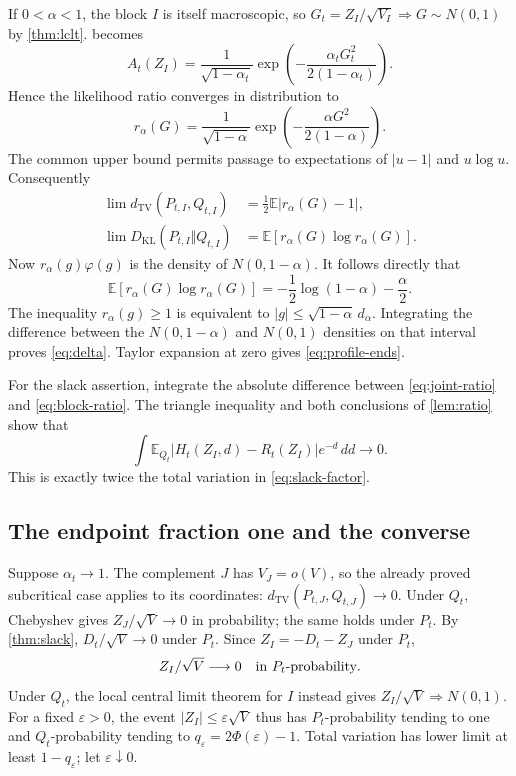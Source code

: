 \documentclass[11pt,a4paper]{article}
\numberwithin{equation}{section}
\theoremstyle{definition}
\theoremstyle{remark}
\newcommand{\E}{\mathbb E}
\newcommand{\Qt}{Q_t}
\newcommand{\TV}{d_{\mathrm{TV}}}
\newcommand{\KL}{D_{\mathrm{KL}}}
\newcommand{\phiN}{\varphi}
\newcommand{\PhiN}{\Phi}
\begin{document}
If $0<\alpha<1$, the block $I$ is itself macroscopic, so
$G_t=Z_I/\sqrt{V_I}\Rightarrow G\sim N(0,1)$ by
\cref{thm:lclt}.  becomes
\[
 A_t(Z_I)=\frac1{\sqrt{1-\alpha_t}}
       \exp\left(-\frac{\alpha_tG_t^2}{2(1-\alpha_t)}\right).
\]
Hence the likelihood ratio converges in distribution to
\begin{equation}\label{eq:r-alpha}
 r_\alpha(G)=\frac1{\sqrt{1-\alpha}}
       \exp\left(-\frac{\alpha G^2}{2(1-\alpha)}\right).
\end{equation}
The common upper bound permits passage to expectations of
$|u-1|$ and $u\log u$. Consequently
\begin{align*}
 \lim\TV(P_{t,I},Q_{t,I})&=\frac12\E|r_\alpha(G)-1|,\\
 \lim\KL(P_{t,I}\Vert Q_{t,I})&=\E[r_\alpha(G)\log r_\alpha(G)].
\end{align*}
Now $r_\alpha(g)\phiN(g)$ is the density of
$N(0,1-\alpha)$. It follows directly that
\[
 \E[r_\alpha(G)\log r_\alpha(G)]
 =-\frac12\log(1-\alpha)-\frac\alpha2.
\]
The inequality $r_\alpha(g)\ge1$ is equivalent to
$|g|\le\sqrt{1-\alpha}\,d_\alpha$. Integrating the difference
between the $N(0,1-\alpha)$ and $N(0,1)$ densities on that interval
proves \cref{eq:delta}. Taylor expansion at zero gives
\cref{eq:profile-ends}.

For the slack assertion, integrate the absolute difference between
\cref{eq:joint-ratio} and \cref{eq:block-ratio}. The triangle
inequality and both conclusions of \cref{lem:ratio} show that
\[
 \int\E_{\Qt}|H_t(Z_I,d)-R_t(Z_I)|e^{-d}\,dd\to0.
\]
This is exactly twice the total variation in \cref{eq:slack-factor}.

\subsection{The endpoint fraction one and the converse}
Suppose $\alpha_t\to1$. The complement $J$ has $V_J=o(V)$, so the
already proved subcritical case applies to its coordinates:
$\TV(P_{t,J},Q_{t,J})\to0$. Under $Q_t$, Chebyshev gives
$Z_J/\sqrt V\to0$ in probability; the same holds under $P_t$.
By \cref{thm:slack}, $D_t/\sqrt V\to0$ under $P_t$. Since
$Z_I=-D_t-Z_J$ under $P_t$,
\[
 Z_I/\sqrt V\longrightarrow0\quad\hbox{in }P_t\hbox{-probability}.
\]
Under $Q_t$, the local central limit theorem for $I$ instead gives
$Z_I/\sqrt V\Rightarrow N(0,1)$. For a fixed $\varepsilon>0$, the
event $|Z_I|\le\varepsilon\sqrt V$ thus has $P_t$-probability
tending to one and $Q_t$-probability tending to
$q_\varepsilon=2\PhiN(\varepsilon)-1$. Total variation has lower
limit at least $1-q_\varepsilon$; let $\varepsilon\downarrow0$.
\end{document}
